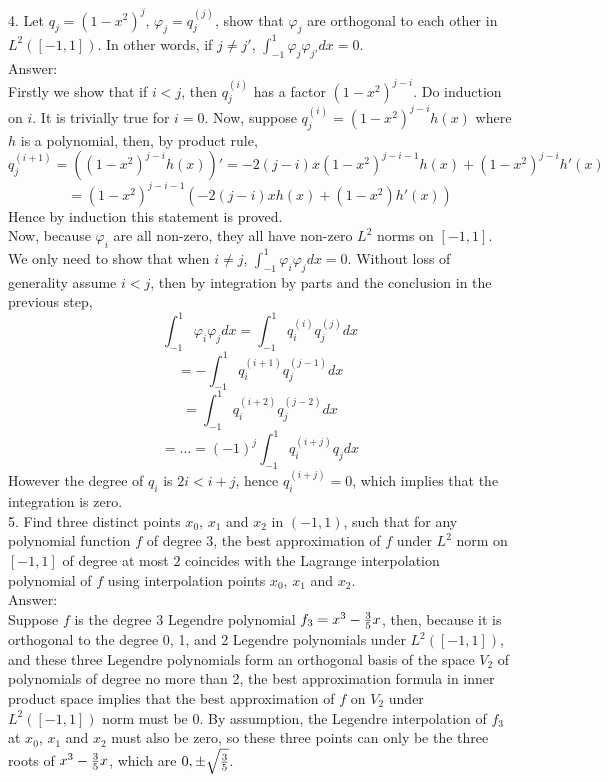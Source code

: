 \documentclass[20pt]{article} %
\theoremstyle{break}
\begin{document}
4. Let $q_j=(1-x^2)^j$, $\varphi_j=q_j^{(j)}$, show that $\varphi_j$ are orthogonal to each other in $L^2([-1, 1])$. In other words, if $j\not=j'$, $\int_{-1}^1\varphi_j\varphi_{j'}dx=0$. \\

Answer:\\

Firstly we show that if $i<j$, then $q_j^{(i)}$ has a factor $(1-x^2)^{j-i}$. Do induction on $i$. It is trivially true for $i=0$. Now, suppose $q_j^{(i)}=(1-x^2)^{j-i}h(x)$ where $h$ is a polynomial, then, by product rule,
\[q_j^{(i+1)}=((1-x^2)^{j-i}h(x))'=-2(j-i)x(1-x^2)^{j-i-1}h(x)+(1-x^2)^{j-i}h'(x)\]
\[=(1-x^2)^{j-i-1}(-2(j-i)xh(x)+(1-x^2)h'(x))\]
Hence by induction this statement is proved.\\

Now, because $\varphi_i$ are all non-zero, they all have non-zero $L^2$ norms on $[-1, 1]$. We only need to show that when $i\not=j$, $\int_{-1}^1\varphi_i\varphi_jdx=0$. Without loss of generality assume $i<j$, then by integration by parts and the conclusion in the previous step,
\[\int_{-1}^1\varphi_i\varphi_jdx=\int_{-1}^1 q_i^{(i)}q_j^{(j)}dx\]
\[=-\int_{-1}^1q_i^{(i+1)}q_j^{(j-1)}dx\]
\[=\int_{-1}^1q_i^{(i+2)}q_j^{(j-2)}dx\]
\[=\dots=(-1)^j\int_{-1}^1q_i^{(i+j)}q_jdx\]
However the degree of $q_i$ is $2i<i+j$, hence $q_i^{(i+j)}=0$, which implies that the integration is zero.\\


5. Find three distinct points $x_0$, $x_1$ and $x_2$ in $(-1, 1)$, such that for any polynomial function $f$ of degree $3$, the best approximation of $f$ under $L^2$ norm on $[-1, 1]$ of degree at most $2$ coincides with the Lagrange interpolation polynomial of $f$ using interpolation points $x_0$, $x_1$ and $x_2$.\\

Answer:\\

Suppose $f$ is the degree 3 Legendre polynomial $f_3=x^3-{3\over 5}x$, then, because it is orthogonal to the degree 0, 1, and 2 Legendre polynomials under $L^2([-1, 1])$, and these three Legendre polynomials form an orthogonal basis of the space $V_2$ of polynomials of degree no more than 2, the best approximation formula in inner product space implies that the best approximation of $f$ on $V_2$ under $L^2([-1, 1])$ norm must be $0$. By assumption, the Legendre interpolation of $f_3$ at $x_0$, $x_1$ and $x_2$ must also be zero, so these three points can only be the three roots of $x^3-{3\over 5}x$, which are $0, \pm\sqrt{3\over 5}$.\\
\end{document}
